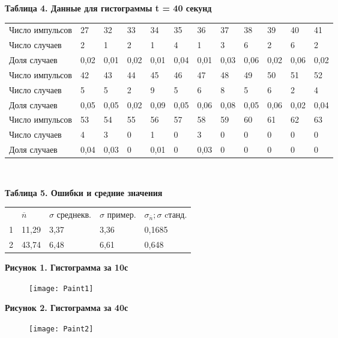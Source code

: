 \documentclass[a4paper, 12pt]{article} %
\begin{document}
\* \textbf{Таблица 4. Данные для гистограммы t = 40 секунд}

\begin{tabular}{llllllllllll}
\cellcolor[HTML]{EFEFEF}Число импульсов & 27   & 32   & 33   & 34   & 35   & 36   & 37   & 38   & 39   & 40   & 41   \\
\cellcolor[HTML]{EFEFEF}Число случаев   & 2    & 1    & 2    & 1    & 4    & 1    & 3    & 6    & 2    & 6    & 2    \\
\cellcolor[HTML]{EFEFEF}Доля случаев    & 0,02 & 0,01 & 0,02 & 0,01 & 0,04 & 0,01 & 0,03 & 0,06 & 0,02 & 0,06 & 0,02 \\
\rowcolor[HTML]{9B9B9B} 
Число импульсов                         & 42   & 43   & 44   & 45   & 46   & 47   & 48   & 49   & 50   & 51   & 52   \\
\rowcolor[HTML]{9B9B9B} 
Число случаев                           & 5    & 5    & 2    & 9    & 5    & 6    & 8    & 5    & 6    & 2    & 4    \\
\rowcolor[HTML]{9B9B9B} 
Доля случаев                            & 0,05 & 0,05 & 0,02 & 0,09 & 0,05 & 0,06 & 0,08 & 0,05 & 0,06 & 0,02 & 0,04 \\
\cellcolor[HTML]{EFEFEF}Число импульсов & 53   & 54   & 55   & 56   & 57   & 58   & 59   & 60   & 61   & 62   & 63   \\
\cellcolor[HTML]{EFEFEF}Число случаев   & 4    & 3    & 0    & 1    & 0    & 3    & 0    & 0    & 0    & 0    & 0    \\
\cellcolor[HTML]{EFEFEF}Доля случаев    & 0,04 & 0,03 & 0    & 0,01 & 0    & 0,03 & 0    & 0    & 0    & 0    & 0   
\end{tabular}

\ 


\* \textbf{Таблица 5. Ошибки и средние значения}

\begin{tabular}{lllll}
\rowcolor[HTML]{EFEFEF} 
                          & \(\overline{n}\)     & \( \sigma \) среднекв.   & \( \sigma \) пример.   & \( \sigma_{\overline{n}}; \sigma \)  cтанд.     \\
\cellcolor[HTML]{EFEFEF}1 & 11,29 & 3,37 & 3,36 & 0,1685 \\
\cellcolor[HTML]{EFEFEF}2 & 43,74 & 6,48 & 6,61 & 0,648 
\end{tabular}

\newpage

\* \textbf{Рисунок 1. Гистограмма за 10с}
\begin{figure}[h]
\centering
\texttt{[image: Paint1]}
\label{fig:mpr}
\end{figure}

\* \textbf{Рисунок 2. Гистограмма за 40с}
\begin{figure}[h]
\centering
\texttt{[image: Paint2]}
\label{fig:mpr}
\end{figure}


\end{document}
